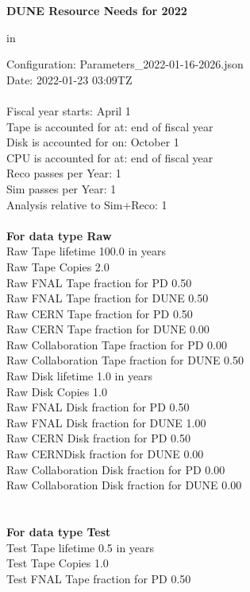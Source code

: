 \documentclass[12pt]{article}
\begin{document}
\centerline{\bf{DUNE Resource Needs for 2022}} in \par Configuration: Parameters\_2022-01-16-2026.json\\
  Date: 2022-01-23 03:09TZ\\
   \\
  
 Fiscal year starts: April 1\\ 
Tape is accounted for at: end of fiscal year\\ 
Disk is accounted for on: October 1\\ 
CPU is accounted for at: end of fiscal year\\ 
Reco passes per Year: 1\\
Sim passes per Year: 1\\
Analysis relative to Sim+Reco: 1\\
\pagebreak
\\
{\bf For data type Raw}\\
   Raw Tape lifetime 100.0 in years\\
   Raw Tape Copies   2.0\\
   Raw FNAL Tape fraction for PD  0.50\\
   Raw FNAL Tape fraction for DUNE  0.50\\
   Raw CERN Tape fraction for PD  0.50\\
   Raw CERN Tape fraction for DUNE  0.00\\
   Raw Collaboration Tape fraction for PD  0.00\\
   Raw Collaboration Tape fraction for DUNE  0.50\\
   Raw Disk lifetime   1.0 in years\\
   Raw Disk Copies   1.0\\
   Raw FNAL Disk fraction for PD  0.50\\
   Raw FNAL Disk fraction for DUNE  1.00\\
   Raw CERN Disk fraction for PD  0.50\\
   Raw CERNDisk fraction for DUNE  0.00\\
   Raw Collaboration Disk fraction for PD  0.00\\
   Raw Collaboration Disk fraction for DUNE  0.00\\
\pagebreak\\
\\
{\bf For data type Test}\\
  Test Tape lifetime   0.5 in years\\
  Test Tape Copies   1.0\\
  Test FNAL Tape fraction for PD  0.50\\
\end{document}
